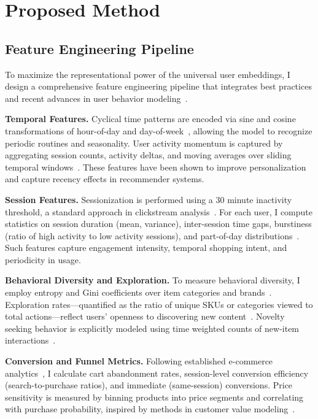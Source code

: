 \documentclass[sigconf]{acmart}
\begin{document}
\section{Proposed Method}
\label{sec:method}

\subsection{Feature Engineering Pipeline}

To maximize the representational power of the universal user embeddings, I design a comprehensive feature engineering pipeline that integrates best practices and recent advances in user behavior modeling~\cite{Quadrana2018, Christoffel2022, Covington2016, Rendle2010, Hidasi2016, Wang2019}.

\textbf{Temporal Features.}
Cyclical time patterns are encoded via sine and cosine transformations of hour-of-day and day-of-week~\cite{Laptev2017}, allowing the model to recognize periodic routines and seasonality. User activity momentum is captured by aggregating session counts, activity deltas, and moving averages over sliding temporal windows~\cite{Quadrana2018}. These features have been shown to improve personalization and capture recency effects in recommender systems.

\textbf{Session Features.}
Sessionization is performed using a 30 minute inactivity threshold, a standard approach in clickstream analysis~\cite{Yang2020, Quadrana2017}. For each user, I compute statistics on session duration (mean, variance), inter-session time gaps, burstiness (ratio of high activity to low activity sessions), and part-of-day distributions~\cite{Christoffel2022}. Such features capture engagement intensity, temporal shopping intent, and periodicity in usage.

\textbf{Behavioral Diversity and Exploration.}
To measure behavioral diversity, I employ entropy and Gini coefficients over item categories and brands~\cite{Rendle2010}. Exploration rates—quantified as the ratio of unique SKUs or categories viewed to total actions—reflect users’ openness to discovering new content~\cite{Cui2018}. Novelty seeking behavior is explicitly modeled using time weighted counts of new-item interactions~\cite{Zhao2019}.

\textbf{Conversion and Funnel Metrics.}
Following established e-commerce analytics~\cite{Covington2016, Zhou2020S3Rec}, I calculate cart abandonment rates, session-level conversion efficiency (search-to-purchase ratios), and immediate (same-session) conversions. Price sensitivity is measured by binning products into price segments and correlating with purchase probability, inspired by methods in customer value modeling~\cite{Krasnova2018}.
\end{document}
